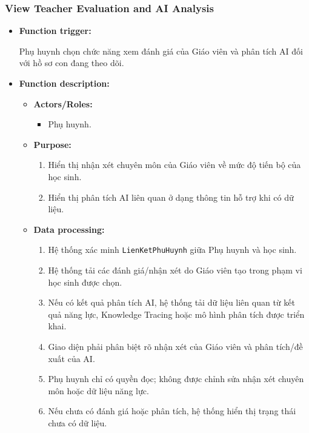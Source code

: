 \documentclass[12pt,a4paper,oneside]{report}
\begin{document}
\subsubsection{View Teacher Evaluation and AI Analysis}
\label{subsubsec:parent-view-teacher-evaluation-ai-analysis}

\begin{itemize}

    \item \textbf{Function trigger:}

    Phụ huynh chọn chức năng xem đánh giá của Giáo viên và phân tích AI đối với hồ sơ con đang theo dõi.

    \item \textbf{Function description:}

    \begin{itemize}

        \item \textbf{Actors/Roles:}
        \begin{itemize}
            \item Phụ huynh.
        \end{itemize}

        \item \textbf{Purpose:}
        \begin{enumerate}
            \item Hiển thị nhận xét chuyên môn của Giáo viên về mức độ tiến bộ của học sinh.
            \item Hiển thị phân tích AI liên quan ở dạng thông tin hỗ trợ khi có dữ liệu.
        \end{enumerate}

        \item \textbf{Data processing:}
        \begin{enumerate}
            \item Hệ thống xác minh \texttt{LienKetPhuHuynh} giữa Phụ huynh và học sinh.
            \item Hệ thống tải các đánh giá/nhận xét do Giáo viên tạo trong phạm vi học sinh được chọn.
            \item Nếu có kết quả phân tích AI, hệ thống tải dữ liệu liên quan từ kết quả năng lực, Knowledge Tracing hoặc mô hình phân tích được triển khai.
            \item Giao diện phải phân biệt rõ nhận xét của Giáo viên và phân tích/đề xuất của AI.
            \item Phụ huynh chỉ có quyền đọc; không được chỉnh sửa nhận xét chuyên môn hoặc dữ liệu năng lực.
            \item Nếu chưa có đánh giá hoặc phân tích, hệ thống hiển thị trạng thái chưa có dữ liệu.
        \end{enumerate}


\end{itemize}
\end{itemize}
\end{document}
